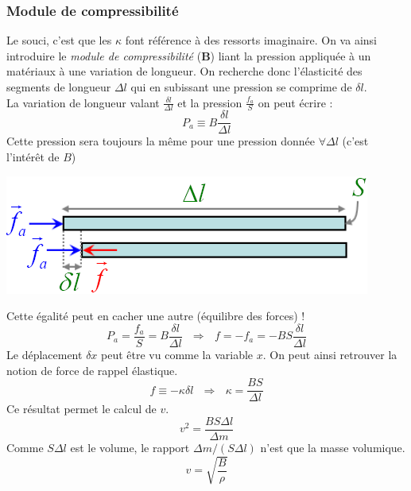 \documentclass	[11pt, a4paper, openany]{book}
\begin{document}
\subsubsection{Module de compressibilité}
Le souci, c'est que les $\kappa$ font référence à des ressorts imaginaire. On va ainsi introduire le \textit{module de compressibilité} (\textbf{B}) liant la pression appliquée à un matériaux à une variation de longueur. On recherche donc l'élasticité des segments de longueur $\Delta l$ qui en subissant une pression se comprime de $\delta l$. \\
La variation de longueur valant $\frac{\delta l}{\Delta l}$ et la pression $\frac{f_a}{S}$ on peut écrire :
\begin{equation}
P_a \equiv B\frac{\delta l}{\Delta l}
\end{equation}
Cette pression sera toujours la même pour une pression donnée $\forall \Delta l$ (c'est l'intérêt de $B$)
\begin{center}
\includegraphics[scale=0.4]{oo/image28.png}
\end{center}
Cette égalité peut en cacher une autre (équilibre des forces) ! 
\begin{equation}
P_a = \frac{f_a}{S} = B\frac{\delta l}{\Delta l}\ \ \ \Rightarrow\ \ \ f = -f_a = -BS\frac{\delta l}{\Delta l}
\end{equation}
Le déplacement $\delta x$ peut être vu comme la variable $x$. On peut ainsi retrouver la notion de force de rappel élastique.
\begin{equation}
f \equiv -\kappa \delta l\ \ \ \Rightarrow\ \ \ \kappa = \frac{BS}{\Delta l}
\end{equation}
Ce résultat permet le calcul de $v$.
\begin{equation}
v^2 = \frac{BS\Delta l}{\Delta m}
\end{equation}
Comme $S\Delta l$ est le volume, le rapport $\Delta m /(S\Delta l)$ n'est que la masse volumique.
\begin{equation}
v = \sqrt{\frac{B}{\rho}}
\end{equation}
\end{document}
